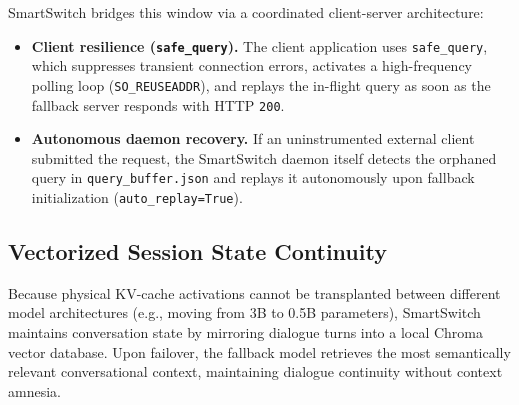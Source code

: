 \documentclass[11pt,a4paper]{article}
\newcommand{\code}[1]{\texttt{#1}}
\begin{document}
SmartSwitch bridges this window via a coordinated client-server architecture:
\begin{itemize}[leftmargin=*]
\item \textbf{Client resilience (\code{safe\_query}).} The client application uses \code{safe\_query}, which suppresses transient connection errors, activates a high-frequency polling loop (\code{SO\_REUSEADDR}), and replays the in-flight query as soon as the fallback server responds with HTTP \code{200}.
\item \textbf{Autonomous daemon recovery.} If an uninstrumented external client submitted the request, the SmartSwitch daemon itself detects the orphaned query in \code{query\_buffer.json} and replays it autonomously upon fallback initialization (\code{auto\_replay=True}).
\end{itemize}

\subsection{Vectorized Session State Continuity}
Because physical KV-cache activations cannot be transplanted between different model architectures (e.g., moving from 3B to 0.5B parameters), SmartSwitch maintains conversation state by mirroring dialogue turns into a local Chroma vector database. Upon failover, the fallback model retrieves the most semantically relevant conversational context, maintaining dialogue continuity without context amnesia.
\end{document}
